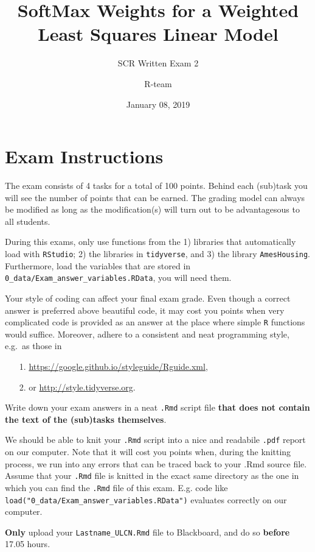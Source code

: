 \documentclass[]{article}
\title{SoftMax Weights for a Weighted Least Squares Linear Model}
\subtitle{SCR Written Exam 2}
\author{R-team}
\date{January 08, 2019}
\begin{document}
\maketitle

\section{Exam Instructions}\label{exam-instructions}

The exam consists of 4 tasks for a total of 100 points. Behind each
(sub)task you will see the number of points that can be earned. The
grading model can always be modified as long as the modification(s) will
turn out to be advantagesous to all students.

During this exams, only use functions from the 1) libraries that
automatically load with \texttt{RStudio}; 2) the libraries in
\texttt{tidyverse}, and 3) the library \texttt{AmesHousing}.
Furthermore, load the variables that are stored in
\texttt{0\_data/Exam\_answer\_variables.RData}, you will need them.

Your style of coding can affect your final exam grade. Even though a
correct answer is preferred above beautiful code, it may cost you points
when very complicated code is provided as an answer at the place where
simple \texttt{R} functions would suffice. Moreover, adhere to a
consistent and neat programming style, e.g.~as those in

\begin{itemize}
\item[1.] \url{https://google.github.io/styleguide/Rguide.xml},
\item[2.] or \url{http://style.tidyverse.org}.
\end{itemize}

Write down your exam answers in a neat \texttt{.Rmd} script file
\textbf{that does not contain the text of the (sub)tasks themselves}.

We should be able to knit your \texttt{.Rmd} script into a nice and
readabile \texttt{.pdf} report on our computer. Note that it will cost
you points when, during the knitting process, we run into any errors
that can be traced back to your .Rmd source file. Assume that your
\texttt{.Rmd} file is knitted in the exact same directory as the one in
which you can find the \texttt{.Rmd} file of this exam. E.g. code like
\texttt{load("0\_data/Exam\_answer\_variables.RData")} evaluates
correctly on our computer.

\textbf{Only} upload your \texttt{Lastname\_ULCN.Rmd} file to
Blackboard, and do so \textbf{before} 17.05 hours.
\end{document}
